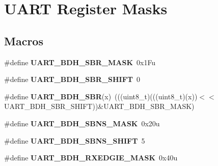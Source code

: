 \hypertarget{group__UART__Register__Masks}{}\section{U\+A\+RT Register Masks}
\label{group__UART__Register__Masks}
\subsection*{Macros}
\begin{DoxyCompactItemize}
\item 
\#define {\bfseries U\+A\+R\+T\+\_\+\+B\+D\+H\+\_\+\+S\+B\+R\+\_\+\+M\+A\+SK}~0x1\+Fu\hypertarget{group__UART__Register__Masks_ga2680dc8176b0c933b4a1b77c5dbb64b7}{}\label{group__UART__Register__Masks_ga2680dc8176b0c933b4a1b77c5dbb64b7}

\item 
\#define {\bfseries U\+A\+R\+T\+\_\+\+B\+D\+H\+\_\+\+S\+B\+R\+\_\+\+S\+H\+I\+FT}~0\hypertarget{group__UART__Register__Masks_gac38d8a98be282d97c4837597a6c02cda}{}\label{group__UART__Register__Masks_gac38d8a98be282d97c4837597a6c02cda}

\item 
\#define {\bfseries U\+A\+R\+T\+\_\+\+B\+D\+H\+\_\+\+S\+BR}(x)~(((uint8\+\_\+t)(((uint8\+\_\+t)(x))$<$$<$U\+A\+R\+T\+\_\+\+B\+D\+H\+\_\+\+S\+B\+R\+\_\+\+S\+H\+I\+FT))\&U\+A\+R\+T\+\_\+\+B\+D\+H\+\_\+\+S\+B\+R\+\_\+\+M\+A\+SK)\hypertarget{group__UART__Register__Masks_ga7d337242135cdbd812b7da47758fbdb6}{}\label{group__UART__Register__Masks_ga7d337242135cdbd812b7da47758fbdb6}

\item 
\#define {\bfseries U\+A\+R\+T\+\_\+\+B\+D\+H\+\_\+\+S\+B\+N\+S\+\_\+\+M\+A\+SK}~0x20u\hypertarget{group__UART__Register__Masks_ga727c0ef3199f627c85fc740265d5134d}{}\label{group__UART__Register__Masks_ga727c0ef3199f627c85fc740265d5134d}

\item 
\#define {\bfseries U\+A\+R\+T\+\_\+\+B\+D\+H\+\_\+\+S\+B\+N\+S\+\_\+\+S\+H\+I\+FT}~5\hypertarget{group__UART__Register__Masks_ga4d6023b67150b98ef12dba445f773109}{}\label{group__UART__Register__Masks_ga4d6023b67150b98ef12dba445f773109}

\item 
\#define {\bfseries U\+A\+R\+T\+\_\+\+B\+D\+H\+\_\+\+R\+X\+E\+D\+G\+I\+E\+\_\+\+M\+A\+SK}~0x40u\hypertarget{group__UART__Register__Masks_ga0882debd8f2c52d4ab8461b22b6519d9}{}\label{group__UART__Register__Masks_ga0882debd8f2c52d4ab8461b22b6519d9}


\end{DoxyCompactItemize}
